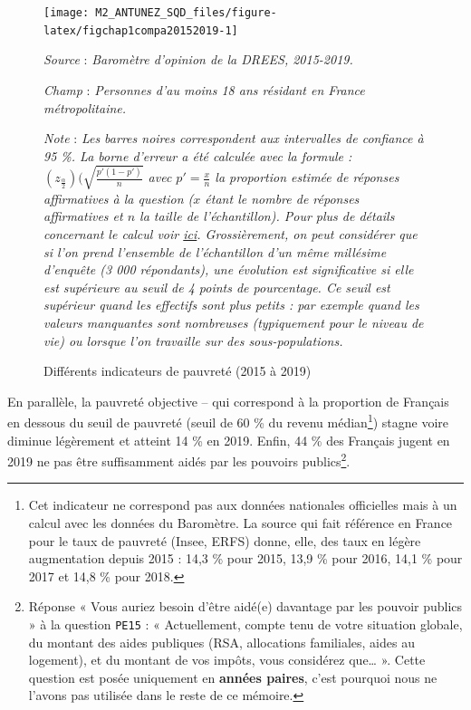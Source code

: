 \documentclass[12pt,a4paper]{reedthesis}
\begin{document}
\begin{figure}[!ht]

{\centering \texttt{[image: M2\_ANTUNEZ\_SQD\_files/figure-latex/figchap1compa20152019-1]} 

}

\caption[Différents indicateurs de pauvreté (2015 à 2019)]{Différents indicateurs de pauvreté (2015 à 2019)}\label{fig:figchap1compa20152019}

\footnotesize


\emph{Source} : \emph{Baromètre d’opinion de la DREES, 2015-2019.}


\emph{Champ} : \emph{Personnes d’au moins 18 ans résidant en France métropolitaine.}


\emph{Note} : \emph{Les barres noires correspondent aux intervalles de confiance à 95 \%. La borne d'erreur a été calculée avec la formule : $({z}_{\frac{{\alpha}}{{2}}})(\sqrt{\frac{{p'(1-p')}}{{n}}}$ avec $p' = \frac{x}{n}$ la proportion estimée de réponses affirmatives à la question ($x$ étant le nombre de réponses affirmatives et $n$ la taille de l'échantillon). Pour plus de détails concernant le calcul voir \href{https://courses.lumenlearning.com/atd-odessa-statistics/chapter/a-population-proportion/}{ici}. Grossièrement, on peut considérer que si l’on prend l’ensemble de l’échantillon d’un même millésime d’enquête (3 000 répondants), une évolution est significative si elle est supérieure au seuil de 4 points de pourcentage. Ce seuil est supérieur quand les effectifs sont plus petits : par exemple quand les valeurs manquantes sont nombreuses (typiquement pour le niveau de vie) ou lorsque l’on travaille sur des sous-populations.}
\normalsize\end{figure}

En parallèle, la pauvreté objective -- qui correspond à la proportion de Français en dessous du seuil de pauvreté (seuil de 60 \% du revenu médian\footnote{Cet indicateur ne correspond pas aux données nationales officielles mais à un calcul avec les données du Baromètre. La source qui fait référence en France pour le taux de pauvreté (Insee, ERFS) donne, elle, des taux en légère augmentation depuis 2015 : 14,3 \% pour 2015, 13,9 \% pour 2016, 14,1 \% pour 2017 et 14,8 \% pour 2018.}) stagne voire diminue légèrement et atteint 14 \% en 2019. Enfin, 44 \% des Français jugent en 2019 ne pas être suffisamment aidés par les pouvoirs publics\footnote{Réponse « Vous auriez besoin d'être aidé(e) davantage par les pouvoir publics » à la question \texttt{PE15} : « Actuellement, compte tenu de votre situation globale, du montant des aides publiques (RSA, allocations familiales, aides au logement), et du montant de vos impôts, vous considérez que\ldots{} ». Cette question est posée uniquement en \textbf{années paires}, c'est pourquoi nous ne l'avons pas utilisée dans le reste de ce mémoire.}.
\end{document}

